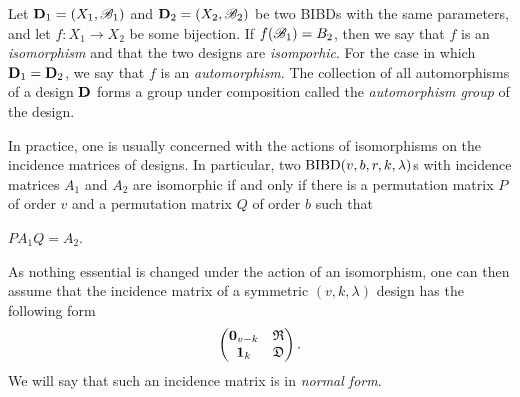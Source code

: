 \documentclass[../../../main]{subfiles}
\begin{document}
\begin{defin}\label{isomorphisms}
 Let $\mathbf{D}_1=(X_1,\mathscr{B}_1)$ and $\mathbf{D}_2=(X_2,\mathscr{B}_2)$ be two BIBDs with the same parameters, and let $f: X_1 \rightarrow X_2$ be some bijection. If $f(\mathscr{B}_1) = B_2$, then we say that $f$ is an {\it isomorphism} and that the two designs are {\it isomporhic}. For the case in which $\mathbf{D}_1 = \mathbf{D}_2$, we say that $f$ is an {\it automorphism}. The collection of all automorphisms of a design $\mathbf{D}$ forms a group under composition called the {\it automorphism group} of the design.

In practice, one is usually concerned with the actions of isomorphisms on the incidence matrices of designs. In particular, two $\text{BIBD}(v,b,r,k,\lambda)$s with incidence matrices $A_1$ and $A_2$ are isomorphic if and only if there is a permutation matrix $P$ of order $v$ and a permutation matrix $Q$ of order $b$ such that 
\begin{defenum}
\item\label{binary-equiv} $PA_1Q = A_2$.
\end{defenum}
\end{defin}

\begin{defin}
As nothing essential is changed under the action of an isomorphism, one can then
assume that the incidence matrix of a symmetric $(v,k,\lambda)$ design has the
following form  
\begin{equation}
    \begin{pmatrix}
     \mathbf{0}_{v-k} & \mathfrak{R} \\
     \mathbf{1}_k & \mathfrak{D}
    \end{pmatrix}.
\end{equation}
We will say that such an incidence matrix is in {\it normal form}.
\end{defin}

\dinkus

\biblio
\end{document}
